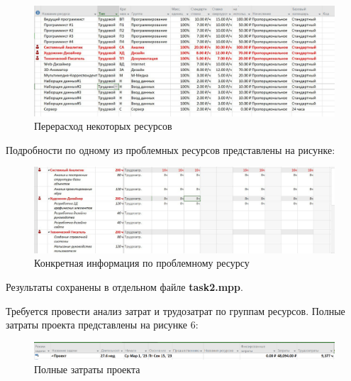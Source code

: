\FloatBarrier
\begin{figure}[h]	
	\begin{center}
		\includegraphics[width=\linewidth]{inc/2-3.jpeg}
	\end{center}
	\captionsetup{justification=centering}
	\caption{Перерасход некоторых ресурсов}
\end{figure}
\FloatBarrier

Подробности по одному из проблемных ресурсов представлены на рисунке:
\FloatBarrier
\begin{figure}[h]	
	\begin{center}
		\includegraphics[width=\linewidth]{inc/2-4.jpeg}
	\end{center}
	\captionsetup{justification=centering}
	\caption{Конкретная информация по проблемному ресурсу}
\end{figure}
\FloatBarrier

Результаты сохранены в отдельном файле \textbf{task2.mpp}.
\newpage

Требуется провести анализ затрат и трудозатрат по группам ресурсов.
Полные затраты проекта представлены на рисунке 6:
\FloatBarrier
\begin{figure}[h]	
	\begin{center}
		\includegraphics[width=\linewidth]{inc/res1.png}
	\end{center}
	\captionsetup{justification=centering}
	\caption{Полные затраты проекта}
\end{figure}
\FloatBarrier

